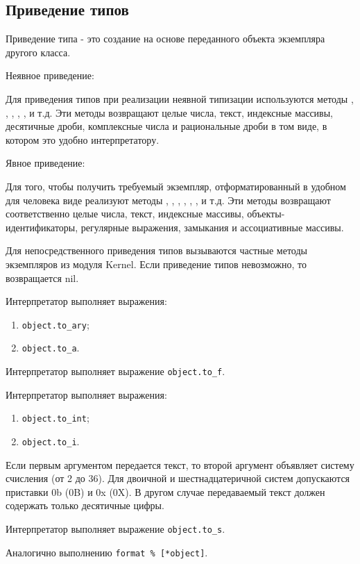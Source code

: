 \subsection{Приведение типов}

Приведение типа - это создание на основе переданного объекта экземпляра другого класса.
\begin{description}
  \item{Неявное приведение:}

  Для приведения типов при реализации неявной типизации используются методы , , , , ,  и т.д. Эти методы возвращают целые числа, текст, индексные массивы, десятичные дроби, комплексные числа и рациональные дроби в том виде, в котором это удобно интерпретатору.

  \item {Явное приведение:}

  Для того, чтобы получить требуемый экземпляр, отформатированный в удобном для человека виде реализуют методы , , , , , ,  и т.д. Эти методы возвращают соответственно целые числа, текст, индексные массивы, объекты-идентификаторы, регулярные выражения, замыкания и ассоциативные массивы.
\end{description}

Для непосредственного приведения типов вызываются частные методы экземпляров из модуля Kernel. Если приведение типов невозможно, то возвращается nil.
\begin{methodlist}
  Интерпретатор выполняет выражения:
  \begin{enumerate}
    \item \verb!object.to_ary!;
    \item \verb!object.to_a!.
  \end{enumerate}

  Интерпретатор выполняет выражение \verb!object.to_f!.

  Интерпретатор выполняет выражения:
  \begin{enumerate}
    \item \verb!object.to_int!;
    \item \verb!object.to_i!.
  \end{enumerate}

  Если первым аргументом передается текст, то второй аргумент объявляет систему счисления (от 2 до 36). Для двоичной и шестнадцатеричной систем допускаются приставки 0b (0B) и 0x (0X). В другом случае передаваемый текст должен содержать только десятичные цифры.

  Интерпретатор выполняет выражение \verb!object.to_s!.

  Аналогично выполнению \verb!format % [*object]!.
\end{methodlist}

